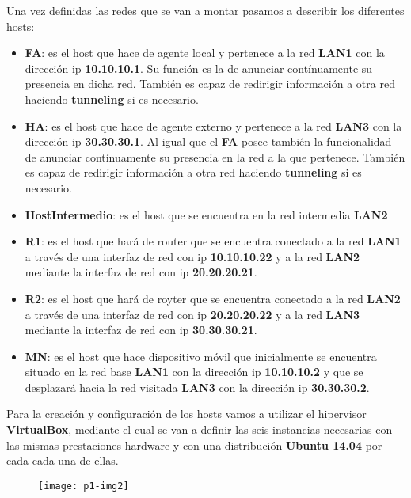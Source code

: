 \documentclass[10pt]{article}
\begin{document}
Una vez definidas las redes que se van a montar pasamos a describir los diferentes hosts:
	\begin{itemize}
		\item \textbf{FA}: es el host que hace de agente local y pertenece a la red \textbf{LAN1} con la dirección ip \textbf{10.10.10.1}. Su función es la de anunciar contínuamente su presencia en dicha red. También es capaz de redirigir información a otra red haciendo \textbf{tunneling} si es necesario.
		\item \textbf{HA}: es el host que hace de agente externo y pertenece a la red \textbf{LAN3} con la dirección ip \textbf{30.30.30.1}. Al igual que el \textbf{FA} posee también la funcionalidad de anunciar contínuamente su presencia en la red a la que pertenece. También es capaz de redirigir información a otra red haciendo \textbf{tunneling} si es necesario.
		\item \textbf{HostIntermedio}: es el host que se encuentra en la red intermedia \textbf{LAN2}
		\item \textbf{R1}: es el host que hará de router que se encuentra conectado a la red \textbf{LAN1} a través de una interfaz de red con ip \textbf{10.10.10.22} y a la red \textbf{LAN2} mediante la interfaz de red con ip \textbf{20.20.20.21}.
		\item \textbf{R2}: es el host que hará de royter que se encuentra conectado a la red \textbf{LAN2} a través de una interfaz de red con ip \textbf{20.20.20.22} y a la red \textbf{LAN3} mediante la interfaz de red con ip \textbf{30.30.30.21}.
		\item \textbf{MN}: es el host que hace dispositivo móvil que inicialmente se encuentra situado en la red base \textbf{LAN1} con la dirección ip \textbf{10.10.10.2} y que se desplazará hacia la red visitada \textbf{LAN3} con la dirección ip \textbf{30.30.30.2}. 
	\end{itemize}

Para la creación y configuración de los hosts vamos a utilizar el hipervisor \textbf{VirtualBox}, mediante el cual se van a definir las seis instancias necesarias con las mismas prestaciones hardware y con una distribución \textbf{Ubuntu 14.04} por cada cada una de ellas. \\

\begin{figure}[H]
	\begin{center}
 		\texttt{[image: p1-img2]}
	\end{center} 
\end{figure}
\end{document}
